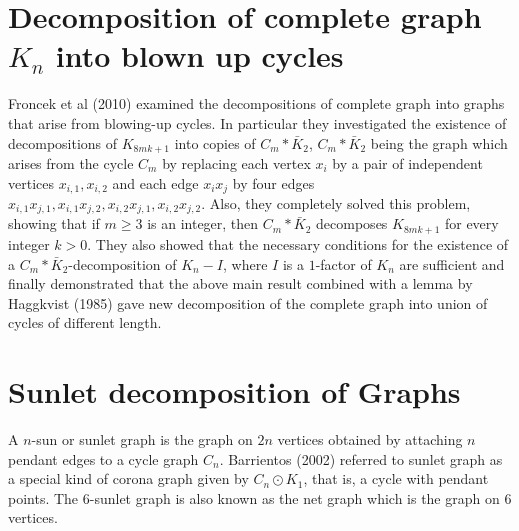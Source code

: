 \documentclass[12pt]{report}
\begin{document}
\section{\protect\smallskip Decomposition of complete graph $K_n$ into blown up cycles}

Froncek  et al (2010) %
examined the decompositions of complete graph into graphs that arise
from blowing-up cycles. In particular they investigated the
existence of decompositions of $K_{8mk+1}$ into copies of
$C_m*\bar{K}_2$, $C_m*\bar{K}_2$ being the graph which arises from
the cycle $C_m$ by replacing each vertex $x_i$ by a pair of
independent vertices $x_{i,1},x_{i,2}$ and each edge $x_ix_j$ by
four edges
$x_{i,1}x_{j,1},x_{i,1}x_{j,2},x_{i,2}x_{j,1},x_{i,2}x_{j,2}$. Also,
they completely solved this problem, showing that if $m\geq 3$ is an
integer, then $C_m*\bar{K}_2$ decomposes $K_{8mk+1}$ for every
integer $k>0$. They also showed that the necessary conditions for
the existence of a $C_m*\bar{K}_2$-decomposition of $K_n-I$, where
$I$ is a $1$-factor of $K_n$ are sufficient and finally demonstrated
that  the above main result combined with a lemma by Haggkvist
(1985) %
gave new decomposition of the complete graph into union of cycles of
different length.

  \section{\protect\smallskip Sunlet decomposition of Graphs}
A $n$-sun  or sunlet graph is the graph on $2n$ vertices obtained by attaching $n$ pendant edges to a cycle graph $C_n$. %
 Barrientos (2002) referred to sunlet graph as a special kind of corona graph %
  given by $C_n \odot K_1$, that is, a cycle with pendant points. %
 The $6$-sunlet graph is also known as the net graph which is the graph on $6$ vertices.
\end{document}

